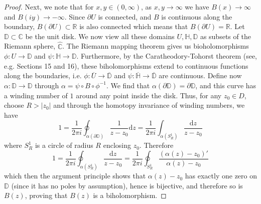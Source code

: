 \documentclass[10pt]{article}
\newcommand{\rr}{\mathbb{R}}
\newcommand{\cc}{\mathbb{C}}
\newcommand{\hh}{\mathbb{H}}
\newcommand{\dd}{\mathbb{D}}
\newcommand{\dif}{\mathrm{d}}
\theoremstyle{plain}
\theoremstyle{definition}
\theoremstyle{plain}
\begin{document}
\begin{proof}
	Next, we note that for $x,y\in (0,\infty)$, as $x,y\to \infty$ we have $B(x) \to \infty$ and $B(iy) \to -\infty$. Since $\partial U$ is connected, and $B$ is continuous along the boundary, $B(\partial U)\subset \rr$ is also connected which means that $B(\partial U) = \rr$. Let $\dd\subset \cc$ be the unit disk. We now view all these domains $U,\hh,\dd$ as subsets of the Riemann sphere, $\hat{\cc}$. The Riemann mapping theorem gives us bioholomorphisms $\phi: U \to \dd$ and $\psi: \hh\to \dd$. Furthermore, by the Caratheodory-Tohorst theorem (see, e.g. \cite{milnor1990dynamicscomplexvariable} Sections 15 and 16), these biholomorphisms extend to continuous functions along the boundaries, i.e. $\phi:\overline{U}\to\overline{\dd}$ and $\psi: \overline{\hh}\to\overline{\dd}$ are continuous. Define now $\alpha:\dd\to \dd$ through $\alpha= \psi\circ B\circ \phi^{-1}$. We find that $\alpha(\partial \dd) = \partial \dd$, and this curve has a winding number of $1$ around any point inside the disk. Thus, for any $z_0 \in D$, choose $R>|z_0|$ and through the homotopy invariance of winding numbers, we have
	\[ 1 = \frac{1}{2\pi i}\oint_{\alpha(\partial \dd)} \frac{1}{z-z_0}\dif z = \frac{1}{2\pi i}  \int_{\alpha(S^1_R)} \frac{\dif z}{z-z_0} \]
	where $S^1_R$ is a circle of radius $R$ enclosing $z_0$. Therefore
	\[ 1 = \frac{1}{2\pi i} \oint_{\alpha(S^1_R)}\frac{\dif z}{z-z_0} = \frac{1}{2\pi i}\oint_{S^1_R}\frac{(\alpha(z)-z_0)'}{\alpha(z)-z_0}\]
	which then the argument principle shows that $\alpha(z)-z_0$ has exactly one zero on $\dd$ (since it has no poles by assumption), hence is bijective, and therefore so is $B(z)$, proving that $B(z)$ is a biholomorphism. 
\end{proof}
\end{document}
